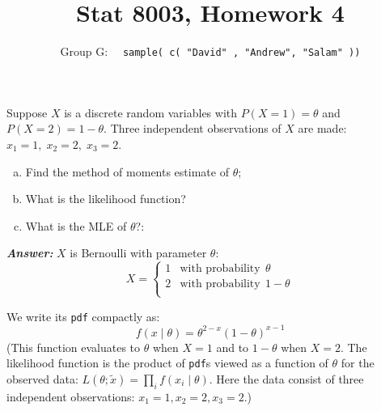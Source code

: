 \documentclass[12pt]{article}
\newenvironment{question}[2][Question]{\begin{trivlist}
\item[\hskip \labelsep {\bfseries #1}\hskip \labelsep {\bfseries #2.}]}{\end{trivlist}}
\begin{document}
 \renewcommand{\arraystretch}{1.3}

 
\title{Stat 8003, Homework 4}%
\author{Group G: \ \ \texttt{sample( c( "David" , "Andrew",  "Salam" ))}
\\ %
} %
 
\maketitle
 
 \begin{question}{4.1} Suppose $X$ is a discrete random variables with $P(X = 1) = \theta$   and $ P(X = 2) = 1-\theta$. Three independent observations of $X$ are made: $x_1 = 1,\; x_2 = 2,\;  x_3 = 2$.
 \begin{enumerate}[(a)]
\item Find the method of moments estimate of $\theta$;
\item What is the likelihood function?
\item What is the MLE of $\theta$?:
\end{enumerate}
\end{question} 


  \textbf{\color{TealBlue}\emph{Answer:} } 
 $X$ is Bernoulli with parameter $\theta$:
  \[ 
X = 
  \begin{cases} 
       1    &  \text{with probability} \ \   \theta \\
       2  &  \text{with probability}  \ \ 1 - \theta \\
   \end{cases}
\]

We write its \texttt{pdf} compactly as:
$$
f(x \mid \theta) = \theta^{2 - x} (1 - \theta)^{x -1}
$$
(This function evaluates to $\theta $ when $X = 1$ and to $1 - \theta$ when $X = 2$. The likelihood function is the product of \texttt{pdf}s viewed as a function of $\theta$ for the observed data: $L(\theta; \tilde x) = \prod_i f(x_i \mid \theta) $. Here the data consist of three independent observations: $x_1 = 1, x_2 = 2, x_3 = 2$.)
\end{document}
